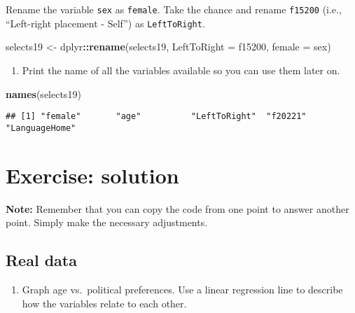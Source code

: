 \documentclass[
]{book}
\newenvironment{Shaded}{\begin{snugshade}}{\end{snugshade}}
\newcommand{\AttributeTok}[1]{\textcolor[rgb]{0.13,0.29,0.53}{#1}}
\newcommand{\FunctionTok}[1]{\textcolor[rgb]{0.13,0.29,0.53}{\textbf{#1}}}
\newcommand{\NormalTok}[1]{#1}
\newcommand{\OtherTok}[1]{\textcolor[rgb]{0.56,0.35,0.01}{#1}}
\newcommand{\SpecialCharTok}[1]{\textcolor[rgb]{0.81,0.36,0.00}{\textbf{#1}}}
\providecommand{\tightlist}{%
  \setlength{\itemsep}{0pt}\setlength{\parskip}{0pt}}
\begin{document}
Rename the variable \texttt{sex} as \texttt{female}. Take the chance and rename \texttt{f15200} (i.e., ``Left-right placement - Self'') as \texttt{LeftToRight}.

\begin{Shaded}
\begin{Highlighting}[]
\NormalTok{selects19 }\OtherTok{\textless{}{-}}\NormalTok{ dplyr}\SpecialCharTok{::}\FunctionTok{rename}\NormalTok{(selects19, }\AttributeTok{LeftToRight =}\NormalTok{ f15200, }\AttributeTok{female =}\NormalTok{ sex)}
\end{Highlighting}
\end{Shaded}

\begin{enumerate}
\def\labelenumi{\arabic{enumi}.}
\setcounter{enumi}{3}
\tightlist
\item
  Print the name of all the variables available so you can use them later on.
\end{enumerate}

\begin{Shaded}
\begin{Highlighting}[]
\FunctionTok{names}\NormalTok{(selects19)}
\end{Highlighting}
\end{Shaded}

\begin{verbatim}
## [1] "female"       "age"          "LeftToRight"  "f20221"       "LanguageHome"
\end{verbatim}

\hypertarget{exercise-solution-1}{%
\section{Exercise: solution}\label{exercise-solution-1}}

\textbf{Note:} Remember that you can copy the code from one point to answer another point. Simply make the necessary adjustments.

\hypertarget{real-data-1}{%
\subsection{Real data}\label{real-data-1}}

\begin{enumerate}
\def\labelenumi{\arabic{enumi}.}
\tightlist
\item
  Graph age vs.~political preferences. Use a linear regression line to describe how the variables relate to each other.
\end{enumerate}
\end{document}
